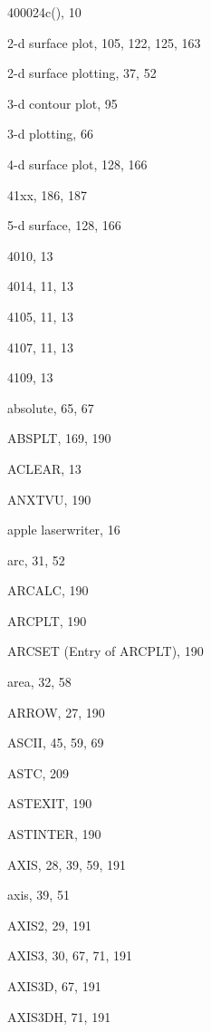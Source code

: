 \begin{theindex}

  \item \4400024c(), 10
  \item {}
  \item 2-d surface plot, 105, 122, 125, 163
  \item 2-d surface plotting, 37, 52
  \item 3-d contour plot, 95
  \item 3-d plotting, 66
  \item 4-d surface plot, 128, 166
  \item 41xx, 186, 187
  \item 5-d surface, 128, 166

  \indexspace

  \item 4010, 13

  \indexspace

  \item 4014, 11, 13

  \indexspace

  \item 4105, 11, 13

  \indexspace

  \item 4107, 11, 13

  \indexspace

  \item 4109, 13

  \indexspace

  \item absolute, 65, 67
  \item ABSPLT, 169, 190
  \item ACLEAR, 13
  \item ANXTVU, 190
  \item apple laserwriter, 16
  \item arc, 31, 52
  \item ARCALC, 190
  \item ARCPLT, 190
  \item ARCSET (Entry of ARCPLT), 190
  \item area, 32, 58
  \item ARROW, 27, 190
  \item ASCII, 45, 59, 69
  \item ASTC, 209
  \item ASTEXIT, 190
  \item ASTINTER, 190
  \item AXIS, 28, 39, 59, 191
  \item axis, 39, 51
  \item AXIS2, 29, 191
  \item AXIS3, 30, 67, 71, 191
  \item AXIS3D, 67, 191
  \item AXIS3DH, 71, 191


\end{theindex}
